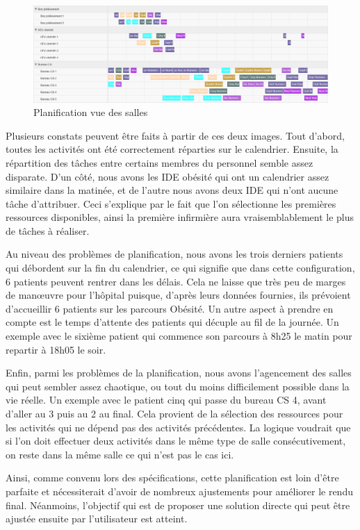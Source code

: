 \documentclass[noposter]{polytech/polytech}
\begin{document}
\begin{figure}
	\includegraphics[scale=0.25]{images/planAuto2}
	\caption{Planification vue des salles}
	\label{fig:planAuto2}
\end{figure}

Plusieurs constats peuvent être faits à partir de ces deux images. Tout d'abord, toutes les activités ont été correctement réparties sur le calendrier. Ensuite, la répartition des tâches entre certains membres du personnel semble assez disparate. D'un côté, nous avons les IDE obésité qui ont un calendrier assez similaire dans la matinée, et de l'autre nous avons deux IDE qui n'ont aucune tâche d'attribuer. Ceci s'explique par le fait que l'on sélectionne les premières ressources disponibles, ainsi la première infirmière aura vraisemblablement le plus de tâches à réaliser. 

Au niveau des problèmes de planification, nous avons les trois derniers patients qui débordent sur la fin du calendrier, ce qui signifie que dans cette configuration, 6 patients peuvent rentrer dans les délais. Cela ne laisse que très peu de marges de manœuvre pour l'hôpital puisque, d'après leurs données fournies, ils prévoient d'accueillir 6 patients sur les parcours Obésité. Un autre aspect à prendre en compte est le temps d'attente des patients qui décuple au fil de la journée. Un exemple avec le sixième patient qui commence son parcours à 8h25 le matin pour repartir à 18h05 le soir.

Enfin, parmi les problèmes de la planification, nous avons l'agencement des salles qui peut sembler assez chaotique, ou tout du moins difficilement possible dans la vie réelle. Un exemple avec le patient cinq qui passe du bureau CS 4, avant d'aller au 3 puis au 2 au final. Cela provient de la sélection des ressources pour les activités qui ne dépend pas des activités précédentes. La logique voudrait que si l'on doit effectuer deux activités dans le même type de salle consécutivement, on reste dans la même salle ce qui n'est pas le cas ici. 

Ainsi, comme convenu lors des spécifications, cette planification est loin d'être parfaite et nécessiterait d'avoir de nombreux ajustements pour améliorer le rendu final. Néanmoins, l'objectif qui est de proposer une solution directe qui peut être ajustée ensuite par l'utilisateur est atteint.
\end{document}

